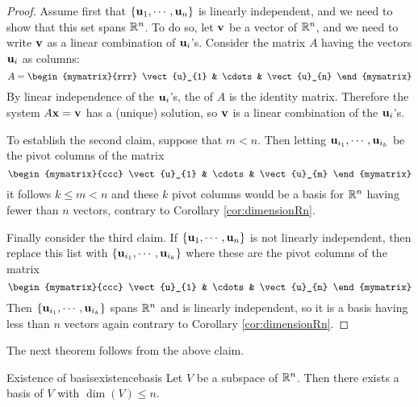 \begin{proof}
Assume first that $\{{\bf u}_{1},\cdots ,{\bf u}_{n}\} $
is linearly independent, and we need to show that this set spans
$\mathbb{R}^{n}$. To do so, let ${\bf v}$ be a vector of
$\mathbb{R}^{n}$, and we need to write ${\bf v}$ as a linear combination of ${\bf u}_i$'s. 
Consider the matrix $A$ having the vectors ${\bf u}_i$  as
columns:
\begin{equation*}
A = 
\begin{mymatrix}{rrr}
\vect{u}_{1} & \cdots & \vect{u}_{n} 
\end{mymatrix}
\end{equation*}
By linear independence of the ${\bf u}_i$'s, the {\rref} of $A$ is
the identity matrix.  Therefore the system $A{\bf x}=
{\bf v}$ has a (unique) solution, so ${\bf v}$ is a linear combination
of the ${\bf u}_i$'s.

To establish the second claim, suppose that $m<n.$ Then letting
${\bf u}_{i_{1}},\cdots ,{\bf u}_{i_{k}}$ be the pivot columns of the
matrix
\begin{equation*}
\begin{mymatrix}{ccc}
\vect{u}_{1} & \cdots & \vect{u}_{m}
\end{mymatrix}
\end{equation*}
it follows $k\leq m<n$ and these $k$ pivot columns would be a basis
for $\mathbb{R}^{n}$ having fewer than $n$ vectors, contrary to
Corollary \ref{cor:dimensionRn}.

Finally consider the third claim. If $\{{\bf u}_{1},\cdots
,{\bf u}_{n}\} $ is not linearly independent, then replace this
list with $\{{\bf u}_{i_{1}},\cdots ,{\bf u}_{i_{k}}\} $ where these
are the pivot columns of the matrix 
\begin{equation*}
\begin{mymatrix}{ccc}
\vect{u}_{1} & \cdots & \vect{u}_{n}
\end{mymatrix}
\end{equation*}
Then $\{{\bf u}_{i_{1}},\cdots ,{\bf u}_{i_{k}}\} $ spans
$\mathbb{R}^{n}$ and is linearly independent, so it is a basis having
less than $n$ vectors again contrary to Corollary \ref{cor:dimensionRn}.
\end{proof}

The next theorem follows from the above claim.

\begin{theorem}{Existence of basis}{existencebasis}
Let $V$ be a subspace of $\mathbb{R}^n$. Then there exists a basis of $V$ with 
 $\dim(V)\leq n$.
\end{theorem}

